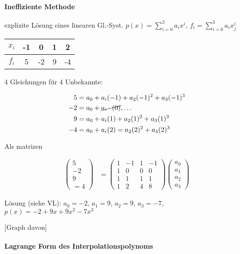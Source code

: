\documentclass[a4paper,ngerman]{scrbook}
\begin{document}
\paragraph{Ineffiziente Methode}

explizite Lösung eines linearen Gl.-Syst\@. $p(x)= \sum_{i=0}^3 a_i x^i$, $f_i = \sum_{i=0}^3 a_i x_j^i$

\begin{tabular}{c||c|c|c|c}
  $x_i$ & -1 & 0 & 1 & 2\\\hline
  $f_i$ & 5 & -2 & 9 & -4
\end{tabular}

4 Gleichungen für 4 Unbekannte:

\begin{align*}
  5 &= a_0 + a_i(-1) + a_2(-1)^2 + a_3(-1)^3\\
  -2 &= a_0 + \cancel{a_i\cdot(0)}, \dots\\
  9 &= a_0 + a_i(1) + a_2(1)^2 +a_3(1)^3\\
  -4 &= a_0 + a_i(2) = a_2(2)^2 + a_4(2)^3
\end{align*}

Als matrizen

\begin{align*}
  \begin{pmatrix}
    5\\-2\\9\\=4
  \end{pmatrix} &=
  \begin{pmatrix}
    1 & -1 & 1 & -1\\
    1 & 0 & 0 & 0\\
    1 & 1 & 1 & 1\\
    1 & 2 & 4 & 8
  \end{pmatrix}
  \begin{pmatrix}
    a_0\\ a_1\\a_2\\a_3
  \end{pmatrix}
\end{align*}

Lösung (siehe VL): $a_0 = -2$, $a_1=9$, $a_2=9$, $a_3=-7$, $p(x) = -2+9x+9x^2-7x^3$

[Graph davon]

\paragraph{Lagrange Form des Interpolationspolynoms}
\end{document}
